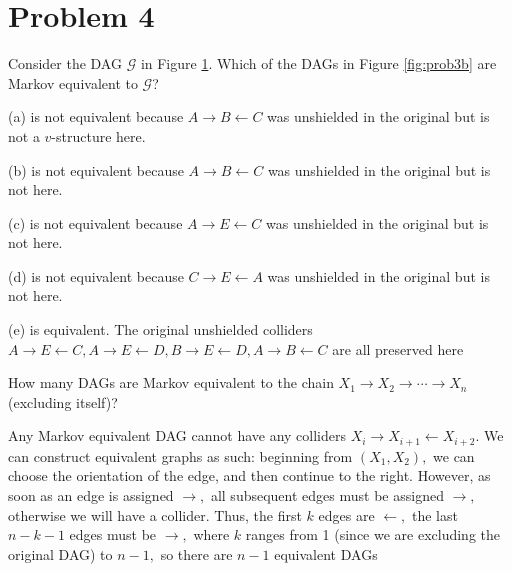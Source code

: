 \documentclass[letterpaper]{article}
\begin{document}
\section*{Problem 4}
\begin{enumerate}[a)]
  \ii Consider the DAG $\mathcal{G}$ in Figure \ref{fig:prob3a}. Which of the DAGs in Figure \ref{fig:prob3b} are Markov equivalent to $\mathcal{G}$? 
  \begin{answer*}
    (a) is not equivalent because $A\to B\gets C$ was unshielded in the original but is not a $v$-structure here. 

    (b) is not equivalent because $A\to B\gets C$ was unshielded in the original but is not here.

    (c) is not equivalent because $A\to E\gets C$ was unshielded in the original but is not here.

    (d) is not equivalent because $C\to E\gets A$ was unshielded in the original but is not here.

    (e) is equivalent. The original unshielded colliders $A\to E\gets C, A\to E\gets D, B\to E\gets D, A\to B\gets C$ are all preserved here

  \end{answer*}

  \ii How many DAGs are Markov equivalent to the chain $X_1 \rightarrow X_2 \rightarrow \cdots \rightarrow X_n$ (excluding itself)?
  \begin{soln}
    Any Markov equivalent DAG cannot have any colliders $X_{i}\to X_{i+1}\gets X_{i+2}.$ We can construct equivalent graphs as such: beginning from $(X_1, X_2),$ we can choose the orientation of the edge, and then continue to the right. However, as soon as an edge is assigned $\to,$ all subsequent edges must be assigned $\to,$ otherwise we will have a collider. Thus, the first $k$ edges are $\gets,$ the last $n-k-1$ edges must be $\to,$ where $k$ ranges from 1 (since we are excluding the original DAG) to $n-1,$ so there are $n-1$ equivalent DAGs
  \end{soln}

\end{enumerate}

\begin{figure}[h]
  \begin{center}
  \end{center}
  \caption{}
  \label{fig:prob3a}
\end{figure}
\end{document}
